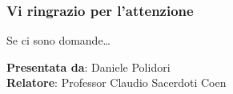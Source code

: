 \documentclass{beamer}
\begin{document}
\begin{frame}

 \frametitle{Vi ringrazio per l'attenzione}

 Se ci sono domande\ldots

 \vfill

 \begin{flushright}
  \textbf{Presentata da}: Daniele Polidori\\
  \textbf{Relatore}: Professor Claudio Sacerdoti Coen
 \end{flushright}

\end{frame}


\begin{frame}

 \frametitle{}


\end{frame}
\end{document}
